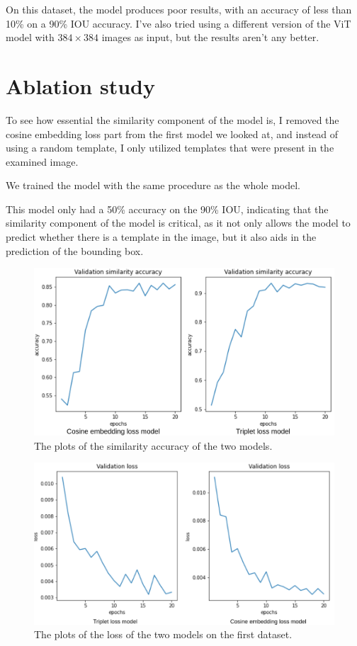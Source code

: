 \documentclass{report}[12pt, a4paper]
\begin{document}
On this dataset, the model produces poor results, with an accuracy of less than 10\% on a 90\% IOU accuracy. I've also tried using a different version of the ViT model with $384\times384$ images as input, but the results aren't any better.

\section{Ablation study}

To see how essential the similarity component of the model is, I removed the cosine embedding loss part from the first model we looked at, and instead of using a random template, I only utilized templates that were present in the examined image.

We trained the model with the same procedure as the whole model.

This model only had a 50\% accuracy on the 90\% IOU, indicating that the similarity component of the model is critical, as it not only allows the model to predict whether there is a template in the image, but it also aids in the prediction of the bounding box.

\begin{figure}[!htp]
    \centering
    \includegraphics[width=12cm]{similarity_accuracy_model_comparison}
    \caption{The plots of the similarity accuracy of the two models.}
    \label{fig:similarity_accuracy_model_comparison}
\end{figure}

\begin{figure}[!htp]
    \centering
    \includegraphics[width=12cm]{loss_model_comparison}
    \caption{The plots of the loss of the two models on the first dataset.}
    \label{fig:loss_model_comparison}
\end{figure}
\end{document}
